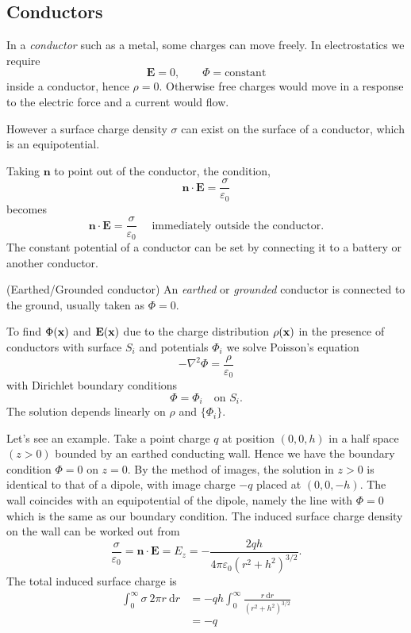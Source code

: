 \documentclass{article}
\begin{document}
\subsection{Conductors} 
In a \textit{conductor} such as a metal, some charges can move freely. In electrostatics we require
\[
	\mathbf E = 0, \qquad \Phi=\text{constant}
\]
inside a conductor, hence $ \rho = 0 $. Otherwise free charges would move in a response to the electric force and a current would flow.\par
However a surface charge density $ \sigma $ can exist on the surface of a conductor, which is an equipotential.\par
Taking $ \mathbf n $ to point out of the conductor, the condition,
\[
	\mathbf n \cdot\mathbf E = \frac\sigma{\varepsilon_0}
\]
becomes
\[
	\mathbf n \cdot\mathbf E = \frac{\sigma}{\varepsilon_0}\quad\text{ immediately outside the conductor}.
\]
The constant potential of a conductor can be set by connecting it to a battery or another conductor.
\begin{definition}
	(Earthed/Grounded conductor) An \textit{earthed} or \textit{grounded} conductor is connected to the ground, usually taken as $ \Phi = 0 $.
\end{definition}
To find $ \Phi(\mathbf{x}) $ and $ \mathbf E(\mathbf{x}) $ due to the charge distribution $ \rho(\mathbf{x}) $ in the presence of conductors with surface $ S_i $ and potentials $ \Phi_i $ we solve Poisson's equation
\[
	-\nabla^2 \Phi = \frac\rho{\varepsilon_0}
\]
with Dirichlet boundary conditions
\[
	\Phi = \Phi_i\quad\text{on } S_i.
\]
The solution depends linearly on $ \rho $ and $ \{\Phi_i\} $.\par
Let's see an example. Take a point charge $ q $ at position $ (0,0,h) $ in a half space $ (z>0) $ bounded by an earthed conducting wall. Hence we have the boundary condition $ \Phi = 0 $ on $ z=0 $. By the method of images, the solution in $ z>0 $ is identical to that of a dipole, with image charge $ -q $ placed at $ (0,0,-h) $. The wall coincides with an equipotential of the dipole, namely the line with $ \Phi = 0 $ which is the same as our boundary condition. The induced surface charge density on the wall can be worked out from
\[
	\frac\sigma{\varepsilon_0} = \mathbf n\cdot\mathbf E = E_z= -\frac{2qh}{4\pi\varepsilon_0(r^2+h^2)^{3/2}}.
\]
The total induced surface charge is
\begin{align*}
	\int_0^\infty \sigma\ 2\pi r \ \mathrm dr &= -qh \int_0^\infty \frac{r\ \mathrm dr}{(r^2+h^2)^{3/2}}\\
	&= -q
\end{align*}
\end{document}
